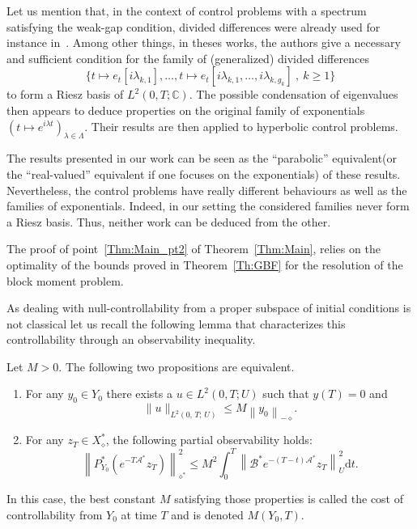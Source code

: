 \documentclass[AHL,Unicode,longabstracts]{cedram}
\newcommand\As{\mathcal{A}^*}
\newcommand\Bs{\mathcal{B}^*}
\newcommand{\Xalphas}{X_\diamond^*}
\newcommand{\Fzp}{Y_0}
\newcommand{\normeU}[1]{\left\| #1 \right\|_U}
\newcommand{\normeXalphas}[1]{\left\| #1 \right\|_{\diamond^*}}
\newcommand{\normeXmalpha}[1]{\left\| #1 \right\|_{-\diamond}}
\newcommand{\PFa}{P_{\Fzp}^*}
\newcommand{\n}{g}
\newcommand{\C}{\mathbb{C}}
\newcommand{\md}{\mathrm{d}}
\begin{document}
Let us mention that, in the context of control problems with a spectrum satisfying the weak-gap condition, divided differences were already used for instance in~\cite{AvdoninIvanov01,BaiocchiKomornikLoreti:2002}. Among other things, in theses works, the authors give a necessary and sufficient condition for the family of (generalized) divided differences
\[
\big\{ t \mapsto e_t[i \lambda_{k,1}], \dotsc, t \mapsto e_t[i \lambda_{k,1}, \dotsc, i \lambda_{k, \n_k}] \:, \: k \geq 1 \big\}
\]
to form a Riesz basis of $L^2(0,T ; \C)$. The possible condensation of eigenvalues then appears to deduce properties on the original family of exponentials $(t\mapsto e^{i \lambda t})_{\lambda \in \Lambda}$. Their results are then applied to hyperbolic control problems.

The results presented in our work can be seen as the ``parabolic'' equivalent\linebreak(or the ``real-valued'' equivalent if one focuses on the exponentials) of these results. Nevertheless, the control problems have really different behaviours as well as the families of exponentials. Indeed, in our setting the considered families never form a Riesz basis. Thus, neither work can be deduced from the other.

The proof of point~\eqref{Thm:Main_pt2} of Theorem~\ref{Thm:Main}, relies on the optimality of the bounds proved in Theorem~\ref{Th:GBF} for the resolution of the block moment problem.

As dealing with null-controllability from a proper subspace of initial conditions is not classical let us recall the following lemma that characterizes this controllability through an observability inequality.

\begin{lemm}\label{Lemmme:Observabilite}
Let $M>0$.
The following two propositions are equivalent.
\begin{enumerate}
\item \label{1.13.1} For any $y_0 \in \Fzp$ there exists a $u \in L^2(0,T;U)$ such that $y(T) = 0$ and
\begin{equation*}
\| u \|_{L^2(0,\,T ;\,U)} \leq M \normeXmalpha{ y_0 }.
\end{equation*}
\item \label{1.13.2}For any $z_T \in \Xalphas$, the following partial observability holds:
\begin{equation}\label{InegObs}
\normeXalphas{ \PFa \left(e^{-T \As} z_T \right) }^2 \leq M^2 \int_0^T \normeU{ \Bs e^{-(T-t) \As} z_T }^2 \md t.
\end{equation}
\end{enumerate}
In this case, the best constant $M$ satisfying those properties is called the cost of controllability from $\Fzp$ at time $T$ and is denoted $M(\Fzp,T)$.
\end{lemm}
\end{document}
